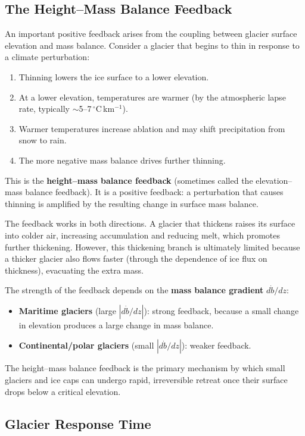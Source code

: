 \documentclass[11pt]{article}
\begin{document}
\subsection{The Height--Mass Balance Feedback}

An important positive feedback arises from the coupling between glacier surface elevation and mass balance.  Consider a glacier that begins to thin in response to a climate perturbation:
\begin{enumerate}
  \item Thinning lowers the ice surface to a lower elevation.
  \item At a lower elevation, temperatures are warmer (by the atmospheric lapse rate, typically $\sim$5--7$\,^{\circ}$C\,km$^{-1}$).
  \item Warmer temperatures increase ablation and may shift precipitation from snow to rain.
  \item The more negative mass balance drives further thinning.
\end{enumerate}
This is the \textbf{height--mass balance feedback} (sometimes called the elevation--mass balance feedback).  It is a positive feedback: a perturbation that causes thinning is amplified by the resulting change in surface mass balance.

The feedback works in both directions.  A glacier that thickens raises its surface into colder air, increasing accumulation and reducing melt, which promotes further thickening.  However, this thickening branch is ultimately limited because a thicker glacier also flows faster (through the dependence of ice flux on thickness), evacuating the extra mass.

The strength of the feedback depends on the \textbf{mass balance gradient} $d\dot{b}/dz$:
\begin{itemize}
  \item \textbf{Maritime glaciers} (large $|d\dot{b}/dz|$): strong feedback, because a small change in elevation produces a large change in mass balance.
  \item \textbf{Continental/polar glaciers} (small $|d\dot{b}/dz|$): weaker feedback.
\end{itemize}

The height--mass balance feedback is the primary mechanism by which small glaciers and ice caps can undergo rapid, irreversible retreat once their surface drops below a critical elevation.

\subsection{Glacier Response Time}
\end{document}
